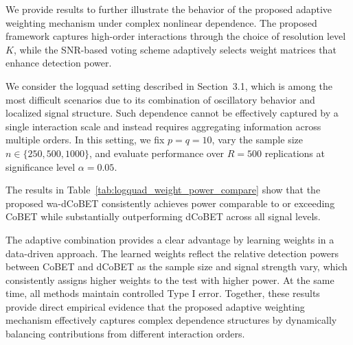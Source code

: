 \documentclass[12pt,reqno,oneside]{amsbook}
\theoremstyle{definition}
\theoremstyle{remark}
\begin{document}
We provide results to further illustrate the behavior of the proposed adaptive weighting mechanism under complex nonlinear dependence. The proposed framework captures high-order interactions through the choice of resolution level $K$, while the SNR-based voting scheme adaptively selects weight matrices that enhance detection power.

We consider the logquad setting described in Section~3.1, which is among the most difficult scenarios due to its combination of oscillatory behavior and localized signal structure. Such dependence cannot be effectively captured by a single interaction scale and instead requires aggregating information across multiple orders. In this setting, we fix $p=q=10$, vary the sample size $n \in \{250,500,1000\}$, and evaluate performance over $R=500$ replications at significance level $\alpha=0.05$.

The results in Table~\ref{tab:logquad_weight_power_compare} show that the proposed wa-dCoBET consistently achieves power comparable to or exceeding CoBET while substantially outperforming dCoBET across all signal levels. 

The adaptive combination provides a clear advantage by learning weights in a data-driven approach. The learned weights reflect 
the relative detection powers between CoBET and dCoBET as the sample size and signal strength vary, which consistently assigns higher weights to the test with higher power. At the same time, all methods maintain controlled Type I error. Together, these results provide direct empirical evidence that the proposed adaptive weighting mechanism effectively captures complex dependence structures by dynamically balancing contributions from different interaction orders.
\end{document}
